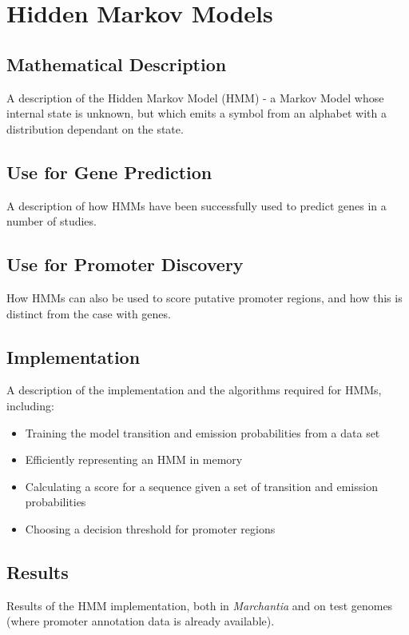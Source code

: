
\chapter{Hidden Markov Models}
\label{chap:HMM} 

\section{Mathematical Description}

A description of the Hidden Markov Model (HMM) - a Markov Model whose internal
state is unknown, but which emits a symbol from an alphabet with a distribution
dependant on the state.


\section{Use for Gene Prediction}

A description of how HMMs have been successfully used to predict genes in a
number of studies.

\section{Use for Promoter Discovery}

How HMMs can also be used to score putative promoter regions, and how this is
distinct from the case with genes.

\section{Implementation}

A description of the implementation and the algorithms required for HMMs,
including:
\begin{itemize}
  \item Training the model transition and emission probabilities from a data
    set
  \item Efficiently representing an HMM in memory
  \item Calculating a score for a sequence given a set of transition and
    emission probabilities
  \item Choosing a decision threshold for promoter regions
\end{itemize}

\section{Results}

Results of the HMM implementation, both in \emph{Marchantia} and on test
genomes (where promoter annotation data is already available).

